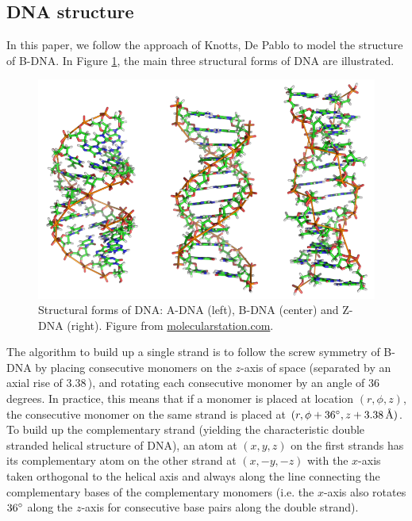 \subsection{DNA structure \label{secStructure}}

In this paper, we follow the approach of Knotts, De Pablo \etal \cite{knotts2007coarse} to model the structure of B-DNA. In Figure \ref{dna_forms}, the main three structural forms of DNA are illustrated.

\begin{figure}[htbp]
\begin{center}
\includegraphics[width=14cm]{images/dna_forms.png}
\caption{Structural forms of DNA: A-DNA (left), B-DNA (center) and Z-DNA (right). Figure from \href{http://www.molecularstation.com}{molecularstation.com}.}
\label{dna_forms}
\end{center}
\end{figure}


The algorithm to build up a single strand is to follow the screw symmetry of B-DNA by placing consecutive monomers on the $z$-axis of space (separated by an axial rise of $3.38$\,\Angstrom), and rotating each consecutive monomer by an angle of $36$ degrees. In practice, this means that if a monomer is placed at location $(r, \phi, z)$, the consecutive monomer on the same strand is placed at $(r, \phi + 36^{\circ}, z + 3.38\,\text{\text{\AA}})$. To build up the complementary strand (yielding the characteristic double stranded helical structure of DNA), an atom at $(x, y, z)$ on the first strands has its complementary atom on the other strand at $(x, -y, -z)$ with the $x$-axis taken orthogonal to the helical axis and always along the line connecting the complementary bases of the complementary monomers (i.e. the $x$-axis also rotates $36^{\circ}$ along the $z$-axis for consecutive base pairs along the double strand).

